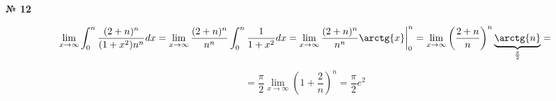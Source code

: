 \documentclass{article}
\begin{document}
\textbf{№ 12} 

$$ \lim\limits_{x\to \infty} \int_{0}^{n} \frac{(2+n)^n}{(1+x^2)n^n}dx
= \lim\limits_{x\to \infty} \frac{(2+n)^n}{n^n} \int_{0}^{n} \frac{1}{1+x^2}dx
= \lim\limits_{x\to \infty} \frac{(2+n)^n}{n^n} \arctg{x} \bigg\vert_{0}^{n} 
= \lim\limits_{x\to \infty} \left( \frac{2+n}{n} \right)^n \underbrace{\arctg{n}}_{\frac{\pi}{2}}
= $$

$$ = \frac{\pi}{2} \lim\limits_{x\to \infty} \left( 1 + \frac{2}{n} \right)^n 
= \frac{\pi}{2} e^2 $$
\end{document}
